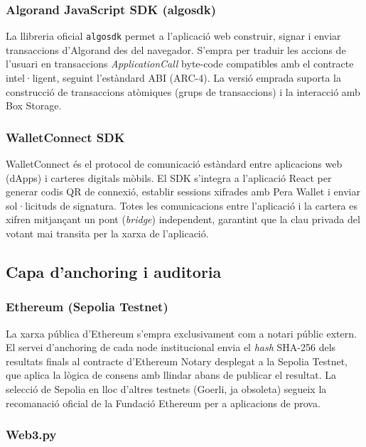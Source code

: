 \subsubsection{Algorand JavaScript SDK (algosdk)}
 
La llibreria oficial \texttt{algosdk} permet a l'aplicació web construir, signar i enviar transaccions d'Algorand des del navegador. S'empra per traduir les accions de l'usuari en transaccions \textit{ApplicationCall} byte-code compatibles amb el contracte intel·ligent, seguint l'estàndard ABI (ARC-4). La versió emprada suporta la construcció de transaccions atòmiques (grups de transaccions) i la interacció amb Box Storage.
 
\subsubsection{WalletConnect SDK}
 
WalletConnect és el protocol de comunicació estàndard entre aplicacions web (dApps) i carteres digitals mòbils. El SDK s'integra a l'aplicació React per generar codis QR de connexió, establir sessions xifrades amb Pera Wallet i enviar sol·licituds de signatura. Totes les comunicacions entre l'aplicació i la cartera es xifren mitjançant un pont (\textit{bridge}) independent, garantint que la clau privada del votant mai transita per la xarxa de l'aplicació.
 
\subsection{Capa d'anchoring i auditoria}
 
\subsubsection{Ethereum (Sepolia Testnet)}
 
La xarxa pública d'Ethereum s'empra exclusivament com a notari públic extern. El servei d'anchoring de cada node institucional envia el \textit{hash} SHA-256 dels resultats finals al contracte d'Ethereum Notary desplegat a la Sepolia Testnet, que aplica la lògica de consens amb llindar abans de publicar el resultat. La selecció de Sepolia en lloc d'altres testnets (Goerli, ja obsoleta) segueix la recomanació oficial de la Fundació Ethereum per a aplicacions de prova.
 
\subsubsection{Web3.py}
 
